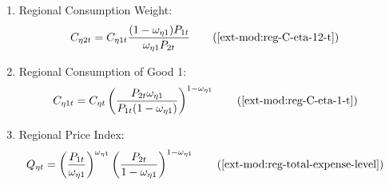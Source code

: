 \documentclass[../thesis.tex]{subfiles}
\begin{document}
{\begin{itemize}
\begin{enumerate}
		\item Regional Consumption Weight:
		\begin{align}
			C_{\eta 2 t} &= C_{\eta 1 t} \frac{(1 - \omega_{\eta 1}) P_{1t}}{\omega_{\eta 1} P_{2t}} \tag{\ref{ext-mod:reg-C-eta-12-t}}
		\end{align}
		
		\item Regional Consumption of Good 1:	
		\begin{align}
			C_{\eta 1 t} &= C_{\eta t} \left( \frac{P_{2t} \omega_{\eta 1}}{P_{1t} (1 - \omega_{\eta 1})} \right)^{1-\omega_{\eta 1}} \tag{\ref{ext-mod:reg-C-eta-1-t}}
		\end{align}
		
		\item Regional Price Index:
		\begin{align}
			Q_{\eta t} &= \left( \frac{P_{1 t}}{\omega_{\eta 1}} \right)^{\omega_{\eta 1}} \left( \frac{P_{2 t}}{1 -\omega_{\eta 1}} \right)^{1 -\omega_{\eta  1}} \tag{\ref{ext-mod:reg-total-expense-level}}
		\end{align}
		
		\begin{comment}
			\item Regional Terms of Trade:
			\begin{align}
				\frac{Q_{1t}}{Q_{2t}} &= \frac{\omega_{21}^{\omega_{21}} (1 -\omega_{21})^{1 -\omega_{21}}}{\omega_{11}^{\omega_{11}} (1 - \omega_{11})^{1 - \omega_{11}}} \tag{\ref{ext-mod:reg-total-expense-level-2}}
			\end{align}

	\begin{align}
		C_{\eta t} &= C_{\eta 1 t}^{\omega_{\eta 1}} C_{\eta 2 t}^{1-\omega_{\eta 1}} \tag{\ref{ext-mod:reg-consumption-aggregation}}
	\end{align}

	\begin{align}
		C_{11t} &= C_{12t} \frac{\omega_{11} P_{2t}}{(1 - \omega_{11}) P_{1t}} \tag{\ref{ext-mod:reg-C-eta-12-t}}
	\end{align}

	\item Regional Consumption Weights:
		\begin{align}
			\frac{C_{11t} C_{22t}}{C_{21t} C_{12t}} &= \frac{\omega_{11} (1 - \omega_{21})}{\omega_{21} (1 - \omega_{11})} \tag{\ref{ext-mod:reg-C-12-12-t}}
		\end{align}

		\begin{align}
			Q_{1t} &= \left( \frac{P_{1 t}}{\omega_{11}} \right)^{\omega_{11}} \left( \frac{P_{2 t}}{1 -\omega_{11}} \right)^{1 -\omega_{11}} \tag{\ref{ext-mod:reg-total-expense-level}}
		\end{align}


\end{comment}
\end{enumerate}
\end{itemize}}
\end{document}
